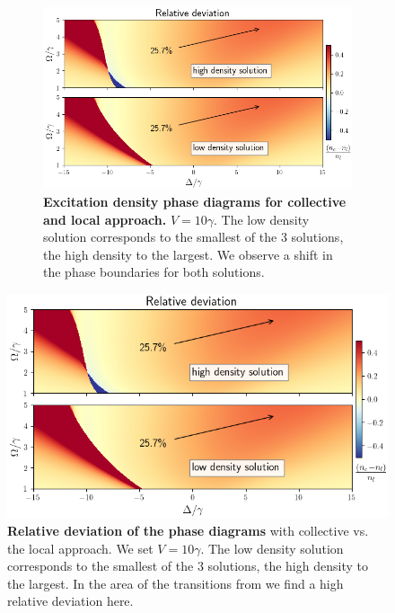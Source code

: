 \documentclass[a0,plainsections]{sciposter}
\begin{document}
\begin{multicols}{2}
	\addtocounter{figure}{-2}
	\begin{figure}
		\begin{minipage}[t]{0.5\textwidth}
			\begin{figure}
				\captionsetup{type=figure}
				\centering
				\vspace*{-60pt}
				\includegraphics[width=\textwidth]{./images/DemoPlot.png}
				\caption{\textbf{Excitation density phase diagrams for collective and local approach.} $V=10\gamma$.
					The low density solution corresponds to the smallest of the 3 solutions, the high density to the largest. We observe a shift in the phase boundaries for both solutions.
				}
				\label{fig:AbsSols}
			\end{figure}
		\end{minipage}
		\hfill
		\begin{minipage}[t]{0.47\textwidth}
			\captionsetup{type=figure}
			\centering
			\vspace*{-16pt}
			\includegraphics[width=\textwidth]{./images/DemoPlot.png}
			\vspace*{-40pt} %
			\caption{\textbf{Relative deviation of the phase diagrams} with collective vs. the local approach. We set $V=10\gamma$.	The low density solution corresponds to the smallest of the 3 solutions, the high density to the largest. In the area of the transitions from  we find a high relative deviation here.}
			\label{fig:DiffofSols}
		\end{minipage}
	\end{figure}


\end{multicols}
\end{document}
